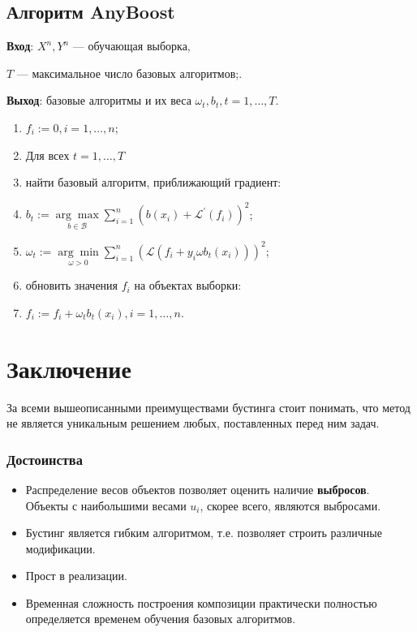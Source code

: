 \documentclass[specialist, 12pt, href]{article}
\begin{document}
\subsection*{Алгоритм AnyBoost}

{\bf {Вход}}: $X^n, Y^n$ --- обучающая выборка,

       \quad \qquad $T$ --- максимальное число базовых алгоритмов;.

{\bf {Выход}}: базовые алгоритмы и их веса $\omega_t, b_t, t = 1,\dots,T$.

\begin{enumerate}
    \item $f_i := 0, i = 1,\dots,n$;
    \item  Для всех $t = 1, \ldots,T$
    \item \quad найти базовый алгоритм, приближающий градиент:
    \item[] \quad$b_t:= \underset{b  \in \mathcal{B}}{\arg\max} \sum\limits_{i=1}^n (b(x_i) + \mathcal{L} ^ \prime (f_{i}))^2$;
    \item \quad$\omega_t := \underset{\omega > 0}{\arg\min} \sum\limits_{i=1}^n (\mathcal{L}(f_i + y_i\omega b_t(x_i)))^2$;
    \item \quad обновить значения $f_i$ на объектах выборки:
    \item[] \quad$f_i := f_i + \omega_t b_t(x_i), i = 1,\dots,n.$
 
\end{enumerate}

\section{ Заключение}

За всеми вышеописанными преимуществами бустинга стоит понимать, что метод не является уникальным решением любых, поставленных перед ним задач. 

\subsubsection*{Достоинства}
 \begin{itemize}
  \item Распределение весов объектов позволяет оценить наличие \textbf{выбросов}. Объекты с наибольшими весами $u_i$, скорее всего, являются выбросами.
  
  \item Бустинг является гибким алгоритмом, т.е. позволяет строить различные модификации.
  
  \item Прост в реализации.
  
  \item Временная сложность построения композиции практически полностью определяется временем обучения базовых алгоритмов.
  
 \end{itemize}
\end{document}
